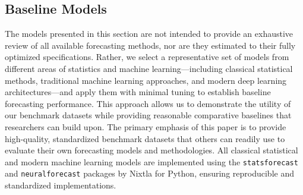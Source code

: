 \documentclass{article}
\begin{document}
\subsection{Baseline Models}

The models presented in this section are not intended to provide an exhaustive review of all available forecasting methods, nor are they estimated to their fully optimized specifications. Rather, we select a representative set of models from different areas of statistics and machine learning---including classical statistical methods, traditional machine learning approaches, and modern deep learning architectures---and apply them with minimal tuning to establish baseline forecasting performance. This approach allows us to demonstrate the utility of our benchmark datasets while providing reasonable comparative baselines that researchers can build upon. The primary emphasis of this paper is to provide high-quality, standardized benchmark datasets that others can readily use to evaluate their own forecasting models and methodologies. All classical statistical and modern machine learning models are implemented using the \texttt{statsforecast} and \texttt{neuralforecast} packages by Nixtla for Python, ensuring reproducible and standardized implementations.
\end{document}

